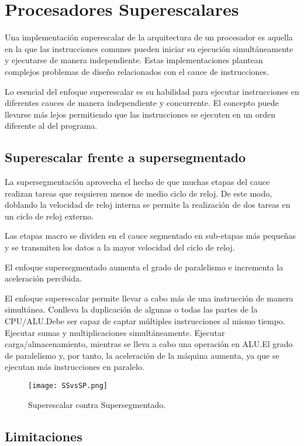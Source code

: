 \section{Procesadores Superescalares}

Una implementación superescalar de la arquitectura de un procesador es aquella en la que las instrucciones comunes pueden iniciar su ejecución simultáneamente y ejecutarse de manera independiente. Estas implementaciones plantean complejos problemas de diseño relacionados con el cauce de instrucciones.

Lo esencial del enfoque superescalar es su habilidad para ejecutar instrucciones en diferentes cauces de manera independiente y concurrente. El concepto puede llevarse más lejos permitiendo que las instrucciones se ejecuten en un orden diferente al del programa. 

\subsection{Superescalar frente a supersegmentado}

La supersegmentación aprovecha el hecho de que muchas etapas del cauce realizan tareas que requieren menos de medio ciclo de reloj. De este modo, doblando la velocidad de reloj interna se permite la realización de dos tareas en un ciclo de reloj externo.

Las etapas macro se dividen en el cauce segmentado en sub-etapas más pequeñas y se transmiten los datos a la mayor velocidad del ciclo de reloj.

El enfoque supersegmentado aumenta el grado de paralelismo e incrementa la aceleración percibida.

El enfoque superescalar permite llevar a cabo más de una instrucción de manera simultánea. Conlleva la duplicación de algunas o todas las partes de la CPU/ALU.\@ Debe ser capaz de captar múltiples instrucciones al mismo tiempo. Ejecutar sumas y multiplicaciones simultáneamente. Ejecutar carga/almacenamiento, mientras se lleva a cabo una operación en ALU.\@ El grado de paralelismo y, por tanto, la aceleración de la máquina aumenta, ya que se ejecutan más instrucciones en paralelo.

\begin{figure}[H]
  \centering
  \texttt{[image: SSvsSP.png]}
  \caption{Superescalar contra Supersegmentado.}
\end{figure}

\subsection*{Limitaciones}

